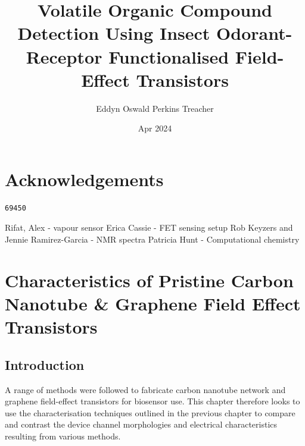 \documentclass[
  a4paper,
]{scrbook}
\title{Volatile Organic Compound Detection Using Insect Odorant-Receptor
Functionalised Field-Effect Transistors}
\author{Eddyn Oswald Perkins Treacher}
\date{Apr 2024}
\renewcommand*\contentsname{Table of contents}
\newcommand\contentsname{Table of contents}
\begin{document}
\frontmatter
\maketitle
\ifdefined\Shaded\renewenvironment{Shaded}{\begin{tcolorbox}[breakable, boxrule=0pt, borderline west={3pt}{0pt}{shadecolor}, enhanced, frame hidden, interior hidden, sharp corners]}{\end{tcolorbox}}\fi

\renewcommand*\contentsname{Table of contents}
{
\setcounter{tocdepth}{2}
\tableofcontents
}
\mainmatter
{}

\hypertarget{acknowledgements}{%
\chapter*{Acknowledgements}\label{acknowledgements}}


\begin{verbatim}
69450
\end{verbatim}

Rifat, Alex - vapour sensor Erica Cassie - FET sensing setup Rob Keyzers
and Jennie Ramirez-Garcia - NMR spectra Patricia Hunt - Computational
chemistry


\hypertarget{sec-pristine-characteristics}{%
\chapter{Characteristics of Pristine Carbon Nanotube \& Graphene Field
Effect Transistors}\label{sec-pristine-characteristics}}

\hypertarget{introduction}{%
\section{Introduction}\label{introduction}}

A range of methods were followed to fabricate carbon nanotube network
and graphene field-effect transistors for biosensor use. This chapter
therefore looks to use the characterisation techniques outlined in the
previous chapter to compare and contrast the device channel morphologies
and electrical characteristics resulting from various methods.
\end{document}
